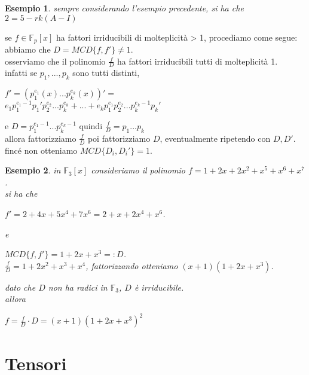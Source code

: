 \documentclass[a4paper,12pt]{article}
\theoremstyle{def}
\theoremstyle{prop}
\theoremstyle{esempio}
\newtheorem*{example}{Esempio}
\theoremstyle{dimostrazione}
\theoremstyle{teo}
\theoremstyle{osservazione}
\begin{document}
\begin{example}
    sempre considerando l'esempio precedente, si ha che \(2 = 5 - rk(A - I)\)\\
\end{example}

\newpage

se \(f \in \mathbb{F}_p[x]\) ha fattori irriducibili di molteplicità > 1, procediamo come segue:\\
abbiamo che \(D = MCD\{f, f'\} \neq 1\).\\
osserviamo che il polinomio \(\frac{f}{D}\) ha fattori irriducibili tutti di molteplicità 1.\\
infatti se \(p_1, ... , p_k\) sono tutti distinti,\\
\begin{center}
    \(f' = (p_1^{e_1}(x) ... p_k^{e_k}(x))' =\)\\
    \(e_1 p_1 ^ {e_1 - 1} p_1'p_2^{e_2} ... p_k^{e_k} + ... + e_k p_1^{e_1}p_2^{e_2} ... p_k^{e_k - 1}p_k'\)\\
\end{center}
e \(D = p_1^{e_1 - 1} ... p_k^{e_k - 1}\) quindi \(\frac{f}{D} = p_1 ... p_k\)\\
allora fattorizziamo \(\frac{f}{D}\) poi fattorizziamo \(D\), eventualmente ripetendo con \(D, D'\).\\
fincé non otteniamo \(MCD\{ D_i, D_i'\} = 1\).

\begin{example}
    in \(\mathbb{F}_3[x]\) consideriamo il polinomio \(f = 1 + 2x + 2x^2 + x^5 + x^6 + x^7\).\\
    si ha che 
    \begin{center}
        \(f' = 2 + 4x + 5x^4 + 7x^6 = 2 + x + 2x^4 + x^6\).\\
    \end{center}
    e
    \begin{center}
        \(MCD\{f, f'\} = 1 + 2x + x^3 =: D\).\\
        \(\frac{f}{D} = 1 + 2x^2 + x^3 + x^4\), fattorizzando otteniamo \((x + 1)(1 + 2x+x^3)\).\\
    \end{center}
    dato che \(D\) non ha radici in \(\mathbb{F}_3\), \(D\) è irriducibile.\\
    allora
    \begin{center}
        \(f = \frac{f}{D} \cdot D = (x + 1)(1 + 2x + x^3)^2\)
    \end{center}
\end{example}

\section{Tensori}
\end{document}

